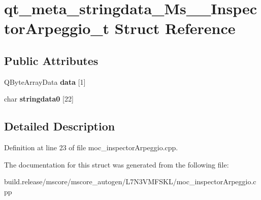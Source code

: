 \hypertarget{structqt__meta__stringdata___ms_____inspector_arpeggio__t}{}\section{qt\+\_\+meta\+\_\+stringdata\+\_\+\+Ms\+\_\+\+\_\+\+Inspector\+Arpeggio\+\_\+t Struct Reference}
\label{structqt__meta__stringdata___ms_____inspector_arpeggio__t}
\subsection*{Public Attributes}
\begin{DoxyCompactItemize}
\item 
\mbox{\label{structqt__meta__stringdata___ms_____inspector_arpeggio__t_a6228135d015e4b4210588329b4c55bf6}} 
Q\+Byte\+Array\+Data {\bfseries data} \mbox{[}1\mbox{]}
\item 
\mbox{\label{structqt__meta__stringdata___ms_____inspector_arpeggio__t_a83d2ee6415f3e8c907da42fe6de731cd}} 
char {\bfseries stringdata0} \mbox{[}22\mbox{]}
\end{DoxyCompactItemize}


\subsection{Detailed Description}


Definition at line 23 of file moc\+\_\+inspector\+Arpeggio.\+cpp.



The documentation for this struct was generated from the following file\+:\begin{DoxyCompactItemize}
\item 
build.\+release/mscore/mscore\+\_\+autogen/\+L7\+N3\+V\+M\+F\+S\+K\+L/moc\+\_\+inspector\+Arpeggio.\+cpp\end{DoxyCompactItemize}
